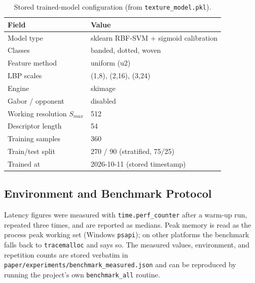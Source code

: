 \documentclass[conference]{IEEEtran}
\begin{document}
\begin{table}[!t]
\renewcommand{\arraystretch}{1.2}
\caption{Stored trained-model configuration (from \texttt{texture\_model.pkl}).}
\label{tab:model}
\centering
\begin{tabular}{@{}ll@{}}
\hline
\bfseries Field & \bfseries Value\\
\hline
Model type  & sklearn RBF-SVM + sigmoid calibration\\
Classes     & banded, dotted, woven\\
Feature method & uniform (u2)\\
LBP scales  & (1,8), (2,16), (3,24)\\
Engine      & skimage\\
Gabor / opponent & disabled\\
Working resolution $S_{max}$ & 512\\
Descriptor length & 54\\
Training samples & 360\\
Train/test split & 270 / 90 (stratified, 75/25)\\
Trained at   & 2026-10-11 (stored timestamp)\\
\hline
\end{tabular}
\end{table}

\subsection{Environment and Benchmark Protocol}
Latency figures were measured with \texttt{time.perf\_counter} after a
warm-up run, repeated three times, and are reported as medians. Peak memory
is read as the process peak working set (Windows \texttt{psapi}); on other
platforms the benchmark falls back to \texttt{tracemalloc} and says so. The
measured values, environment, and repetition counts are stored verbatim in
\texttt{paper/experiments/benchmark\_measured.json} and can be reproduced
by running the project's own \texttt{benchmark\_all} routine.
\end{document}
